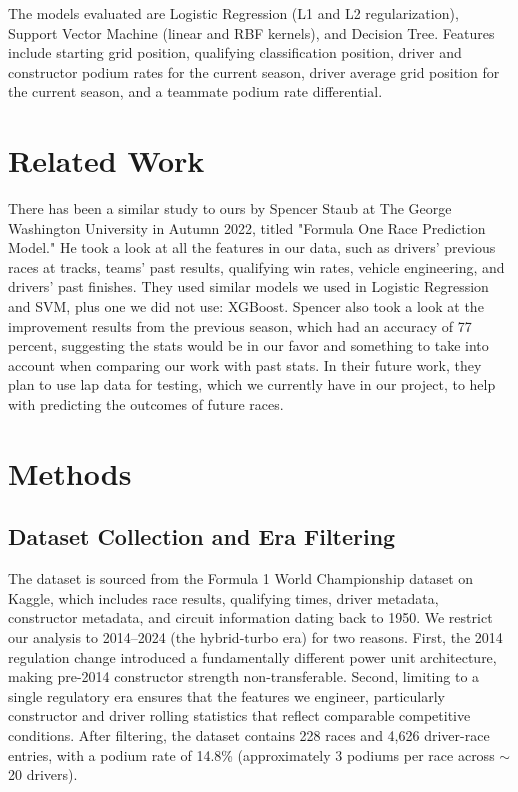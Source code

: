 \documentclass[11pt]{article}
\begin{document}
The models evaluated are Logistic Regression (L1 and L2 regularization), Support Vector Machine (linear and RBF kernels), and Decision Tree. Features include starting grid position, qualifying classification position, driver and constructor podium rates for the current season, driver average grid position for the current season, and a teammate podium rate differential.

\section{Related Work}

There has been a similar study to ours by Spencer Staub at The George Washington University in Autumn 2022, titled "Formula One Race Prediction Model." He took a look at all the features in our data, such as drivers' previous races at tracks, teams' past results, qualifying win rates, vehicle engineering, and drivers' past finishes. They used similar models we used in Logistic Regression and SVM, plus one we did not use: XGBoost. Spencer also took a look at the improvement results from the previous season, which had an accuracy of 77 percent, suggesting the stats would be in our favor and something to take into account when comparing our work with past stats. In their future work, they plan to use lap data for testing, which we currently have in our project, to help with predicting the outcomes of future races.

\section{Methods}

\subsection{Dataset Collection and Era Filtering}
 
The dataset is sourced from the Formula 1 World Championship dataset on Kaggle, which includes race results, qualifying times, driver metadata, constructor metadata, and circuit information dating back to 1950. We restrict our analysis to 2014--2024 (the hybrid-turbo era) for two reasons. First, the 2014 regulation change introduced a fundamentally different power unit architecture, making pre-2014 constructor strength non-transferable. Second, limiting to a single regulatory era ensures that the features we engineer, particularly constructor and driver rolling statistics that reflect comparable competitive conditions. After filtering, the dataset contains 228 races and 4,626 driver-race entries, with a podium rate of 14.8\% (approximately 3 podiums per race across $\sim$20 drivers).
 
\end{document}
